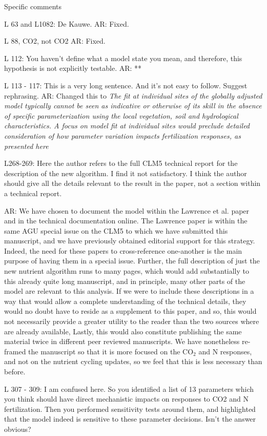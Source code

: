 \documentclass{article}
\begin{document}
{Specific comments 

L 63 and L1082: De Kauwe. 
\textsf{AR: Fixed.}

L 88, CO2, not CO2 
\textsf{AR: Fixed.}

L 112: You haven't define what a model state you mean, and therefore, this hypothesis is not explicitly testable. 
\textsf{AR: **}

L 113 - 117: This is a very long sentence. And it's not easy to follow. Suggest rephrasing.
\textsf{AR: Changed this to \emph{ The fit at individual sites of the globally adjusted model typically cannot be seen as indicative or otherwise of its skill in the absence of specific parameterization using the local vegetation, soil and hydrological characteristics. A focus on model fit at individual sites would preclude detailed consideration of how parameter variation impacts fertilization responses, as presented here}}

L268-269: Here the author refers to the full CLM5 technical report for the description of the new algorithm. I find it not satisfactory. I think the author should give all the details relevant to the result in the paper, not a section within a technical report. 

\textsf{AR: We have chosen to document the model within the Lawrence et al. paper and in the technical documentation online. The Lawrence paper is within the same AGU special issue on the CLM5 to which we have submitted this manuscript, and we have previously obtained editorial support for this strategy. Indeed, the need for these papers to cross-reference one-another is the main purpose of having them in a special issue.  Further, the full description of just the new nutrient algorithm runs to many pages, which would add substantially to this already quite long manuscript, and in principle, many other parts of the model are relevant to this analysis. If we were to include these descriptions in a way that would allow a complete understanding of the technical details, they would no doubt have to reside as a supplement to this paper, and so,  this would not necessarily provide a greater utility to the reader than the two sources where are already available, Lastly, this would also constitute publishing the same material twice in different peer reviewed manuscripts.  We have nonetheless re-framed the manuscript so that it is more focused on the CO$_{2}$ and N responses, and not on the nutrient cycling updates, so we feel that this is less necessary than before.}

L 307 - 309: I am confused here. So you identified a list of 13 parameters which you think should have direct mechanistic impacts on responses to CO2 and N fertilization. Then you performed sensitivity tests around them, and highlighted that the model indeed is sensitive to these parameter decisions. Isn't the answer obvious? 

}
\end{document}

